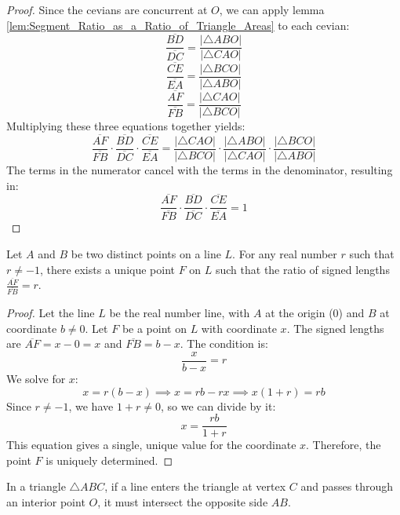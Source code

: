 \begin{proof}
    Since the cevians are concurrent at $O$, we can apply lemma \ref{lem:Segment_Ratio_as_a_Ratio_of_Triangle_Areas} to each cevian:
    \[ \frac{\overline{BD}}{\overline{DC}} = \frac{|\triangle ABO|}{|\triangle CAO|} \]
    \[ \frac{\overline{CE}}{\overline{EA}} = \frac{|\triangle BCO|}{|\triangle ABO|} \]
    \[ \frac{\overline{AF}}{\overline{FB}} = \frac{|\triangle CAO|}{|\triangle BCO|} \]
    Multiplying these three equations together yields:
    \[ \frac{\overline{AF}}{\overline{FB}} \cdot \frac{\overline{BD}}{\overline{DC}} \cdot \frac{\overline{CE}}{\overline{EA}} = \frac{|\triangle CAO|}{|\triangle BCO|} \cdot \frac{|\triangle ABO|}{|\triangle CAO|} \cdot \frac{|\triangle BCO|}{|\triangle ABO|} \]
    The terms in the numerator cancel with the terms in the denominator, resulting in:
    \[ \frac{\overline{AF}}{\overline{FB}} \cdot \frac{\overline{BD}}{\overline{DC}} \cdot \frac{\overline{CE}}{\overline{EA}} = 1 \]
\end{proof}

\begin{lemma}
    \label{lem:Uniqueness_of_Point_Dividing_a_Segment}
    Let $A$ and $B$ be two distinct points on a line $L$. For any real number $r$ such that $r \neq -1$, there exists a unique point $F$ on $L$ such that the ratio of signed lengths $\frac{\overline{AF}}{\overline{FB}} = r$.
\end{lemma}

\begin{proof}
    Let the line $L$ be the real number line, with $A$ at the origin (0) and $B$ at coordinate $b \neq 0$. Let $F$ be a point on $L$ with coordinate $x$. The signed lengths are $\overline{AF} = x - 0 = x$ and $\overline{FB} = b - x$. The condition is:
    \[ \frac{x}{b-x} = r \]
    We solve for $x$:
    \[ x = r(b-x) \implies x = rb - rx \implies x(1+r) = rb \]
    Since $r \neq -1$, we have $1+r \neq 0$, so we can divide by it:
    \[ x = \frac{rb}{1+r} \]
    This equation gives a single, unique value for the coordinate $x$. Therefore, the point $F$ is uniquely determined.
\end{proof}

\begin{lemma}
    \label{lem:Ray_Intersection_Lemma}
    In a triangle $\triangle ABC$, if a line enters the triangle at vertex $C$ and passes through an interior point $O$, it must intersect the opposite side $AB$.
\end{lemma}

